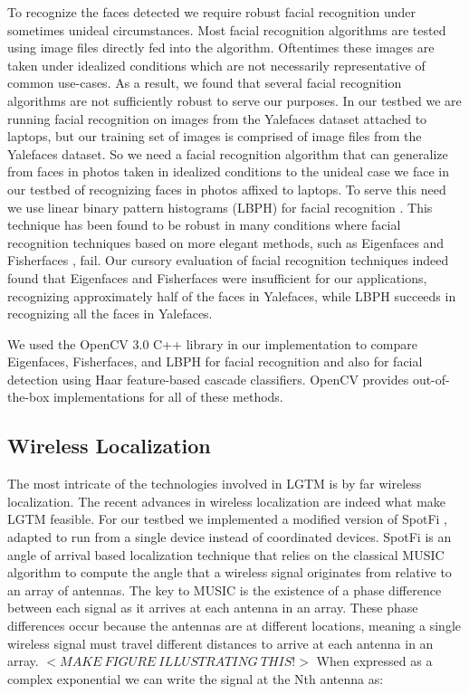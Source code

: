 \documentclass[12pt]{report}
\begin{document}
To recognize the faces detected we require robust facial recognition under sometimes unideal circumstances. Most facial recognition algorithms are tested using image files directly fed into the algorithm. Oftentimes these images are taken under idealized conditions which are not necessarily representative of common use-cases. As a result, we found that several facial recognition algorithms are not sufficiently robust to serve our purposes. In our testbed we are running facial recognition on images from the Yalefaces dataset attached to laptops, but our training set of images is comprised of image files from the Yalefaces \cite{FisherfacesBelhumeur1997} dataset. So we need a facial recognition algorithm that can generalize from faces in photos taken in idealized conditions to the unideal case we face in our testbed of recognizing faces in photos affixed to laptops. To serve this need we use linear binary pattern histograms (LBPH) for facial recognition \cite{LBPHAhonen2004,LearningMultiScalBlockLBPHLiao2007}. This technique has been found to be robust in many conditions where facial recognition techniques based on more elegant methods, such as Eigenfaces \cite{EigenfacesTurk1991} and Fisherfaces \cite{FisherfacesBelhumeur1997}, fail. Our cursory evaluation of facial recognition techniques indeed found that Eigenfaces and Fisherfaces were insufficient for our applications, recognizing approximately half of the faces in Yalefaces, while LBPH succeeds in recognizing all the faces in Yalefaces. \par

We used the OpenCV 3.0 \cite{OpenCV} C++ library in our implementation to compare Eigenfaces, Fisherfaces, and LBPH for facial recognition and also for facial detection using Haar feature-based cascade classifiers. OpenCV provides out-of-the-box implementations for all of these methods. \par

\subsection{Wireless Localization}
The most intricate of the technologies involved in LGTM is by far wireless localization. The recent advances in wireless localization \cite{UbicarseKumar2014,SpotFiKotaru2015,ChronosSingleAPLocalizationVasisht2016} are indeed what make LGTM feasible. For our testbed we implemented a modified version of SpotFi \cite{SpotFiKotaru2015}, adapted to run from a single device instead of coordinated devices. SpotFi is an angle of arrival based localization technique that relies on the classical MUSIC algorithm \cite{MUSICSchmidt1986} to compute the angle that a wireless signal originates from relative to an array of antennas. The key to MUSIC is the existence of a phase difference between each signal as it arrives at each antenna in an array. These phase differences occur because the antennas are at different locations, meaning a single wireless signal must travel different distances to arrive at each antenna in an array. $<MAKE \: FIGURE \: ILLUSTRATING \: THIS!>$  When expressed as a complex exponential we can write the signal at the Nth antenna as:
\end{document}
